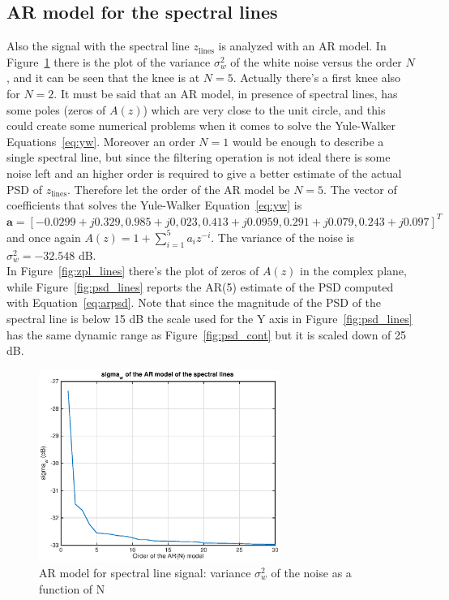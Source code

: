 \documentclass[10pt]{article}
\numberwithin{equation}{section}
\begin{document}
\subsection*{AR model for the spectral lines}
Also the signal with the spectral line $z_{\text{lines}}$ is analyzed with an AR model.
In Figure~\ref{fig:ar_lines_sigma} there is the plot of the variance $\sigma_w^2$ of the white noise versus the order $N$, and it can be seen that the knee is at $N=5$. Actually there's a first knee also for $N=2$. It must be said that an AR model, in presence of spectral lines, has some poles (zeros of $A(z)$) which are very close to the unit circle, and this could create some numerical problems when it comes to solve the Yule-Walker Equations~\ref{eq:yw}. Moreover an order $N=1$ would be enough to describe a single spectral line, but since the filtering operation is not ideal there is some noise left and an higher order is required to give a better estimate of the actual PSD of $z_{\text{lines}}$.
Therefore let the order of the AR model be $N=5$. The vector of coefficients that solves the Yule-Walker Equation~\ref{eq:yw} is $\mathbf{a} = [-0.0299 + j0.329, 0.985 + j0,023, 0.413 + j0.0959, 0.291 + j0.079, 0.243 + j0.097]^T$ and once again $A(z) = 1 + \sum_{i=1}^5a_i z^{-i}$. The variance of the noise is $\sigma_w^2 = -32.548$ dB. \\ %
In Figure~\ref{fig:zpl_lines} there's the plot of zeros of $A(z)$ in the complex plane, while Figure~\ref{fig:psd_lines} reports the AR(5) estimate of the PSD computed with Equation~\ref{eq:arpsd}. Note that since the magnitude of the PSD of the spectral line is below 15 dB the scale used for the Y axis in Figure~\ref{fig:psd_lines} has the same dynamic range as Figure~\ref{fig:psd_cont} but it is scaled down of 25 dB.


\begin{figure}[h!]
  \centering
  \includegraphics[width = 0.7\textwidth]{images/ar_lines_sigma}
  \caption{AR model for spectral line signal: variance $\sigma_w^2$ of the noise as a function of N}
  \label{fig:ar_lines_sigma}
\end{figure}
\end{document}
